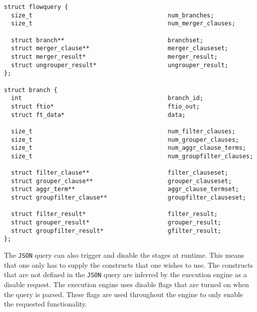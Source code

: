 \begin{lstlisting}
struct flowquery {
  size_t                                      num_branches;
  size_t                                      num_merger_clauses;

  struct branch**                             branchset;
  struct merger_clause**                      merger_clauseset;
  struct merger_result*                       merger_result;
  struct ungrouper_result*                    ungrouper_result;
};

struct branch {
  int                                         branch_id;
  struct ftio*                                ftio_out;
  struct ft_data*                             data;

  size_t                                      num_filter_clauses;
  size_t                                      num_grouper_clauses;
  size_t                                      num_aggr_clause_terms;
  size_t                                      num_groupfilter_clauses;

  struct filter_clause**                      filter_clauseset;
  struct grouper_clause**                     grouper_clauseset;
  struct aggr_term**                          aggr_clause_termset;
  struct groupfilter_clause**                 groupfilter_clauseset;

  struct filter_result*                       filter_result;
  struct grouper_result*                      grouper_result;
  struct groupfilter_result*                  gfilter_result;
};
\end{lstlisting}

The \texttt{JSON} query can also trigger and disable the stages at runtime.
This means that one only has to supply the constructs that one wishes to use.
The constructs that are not defined in the \texttt{JSON} query are inferred by
the execution engine as a disable request. The execution engine uses disable
flags that are turned on when the query is parsed. These flags are used
throughout the engine to only enable the requested functionality.

